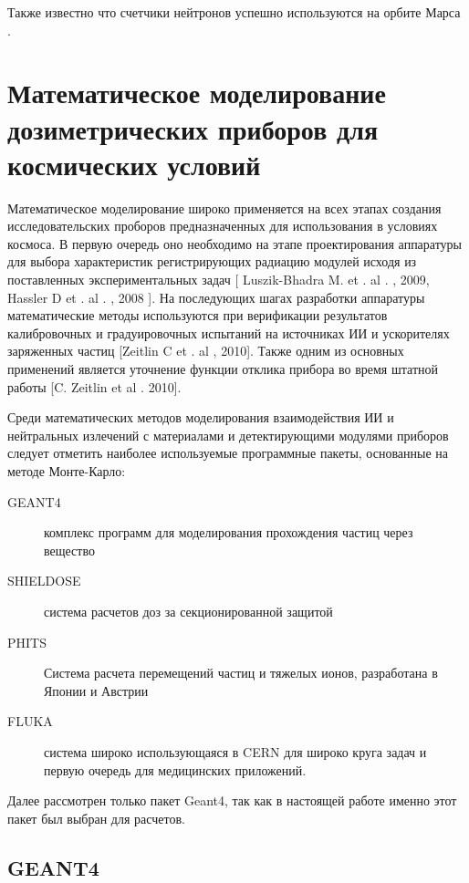Также известно что счетчики нейтронов успешно используются на орбите Марса \cite{Sanin2012}.

\section{Математическое моделирование дозиметрических приборов для космических условий}

Математическое моделирование широко применяется на всех этапах создания исследовательских проборов предназначенных для использования в условиях космоса. В первую очередь оно необходимо на этапе проектирования аппаратуры для выбора характеристик регистрирующих радиацию модулей исходя из поставленных экспериментальных задач [ Luszik-Bhadra M.  et . al . ,  2009,  Hassler  D et .  al . ,  2008 ]. На последующих шагах разработки аппаратуры математические методы используются при верификации результатов калибровочных и градуировочных испытаний на источниках ИИ и ускорителях заряженных частиц [Zeitlin C et . al ,  2010]. Также одним из основных применений является уточнение функции отклика прибора во время штатной работы [C. Zeitlin et al . 2010]. 


Среди математических методов моделирования взаимодействия ИИ и нейтральных излечений с материалами и детектирующими модулями приборов следует отметить наиболее используемые программные пакеты, основанные на методе Монте-Карло:


\begin{description}
	\item[GEANT4] комплекс программ для моделирования прохождения частиц через вещество\cite{Allison2006}
	\item[SHIELDOSE ] система расчетов доз за секционированной защитой \cite{SeltzerS.M.1980}
	\item[PHITS] Система расчета перемещений частиц и тяжелых ионов, 
	разработана в Японии и Австрии%
	\item[FLUKA] система широко использующаяся в CERN для широко круга задач и 
	первую очередь для медицинских приложений\cite{Fasso2003, fluka2014}.
\end{description}

Далее рассмотрен только пакет Geant4, так как в настоящей работе именно этот пакет 
был выбран для расчетов. 


\subsection{GEANT4}

